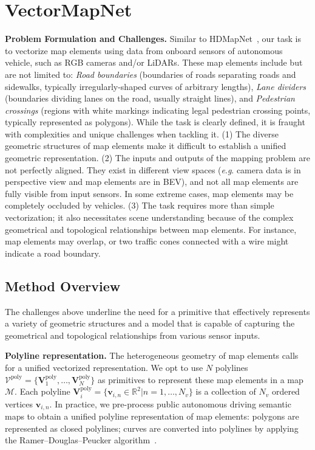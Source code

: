 \documentclass{article}
\newcommand{\eg}{\textit{e}.\textit{g}. }
\theoremstyle{plain}
\theoremstyle{definition}
\theoremstyle{remark}
\begin{document}
\section{VectorMapNet}
\label{sec:VectorMapNet}
\noindent\textbf{Problem Formulation and Challenges.}
Similar to HDMapNet~\citep{li2021hdmapnet}, our task is to vectorize map elements using data from onboard sensors of autonomous vehicle, such as RGB cameras and/or LiDARs. These map elements include but are not limited to: \textit{Road boundaries} (boundaries of roads separating roads and sidewalks, typically irregularly-shaped curves of arbitrary lengths), \textit{Lane dividers} (boundaries dividing lanes on the road, usually straight lines), and \textit{Pedestrian crossings} (regions with white markings indicating legal pedestrian crossing points, typically represented as polygons). 
While the task is clearly defined, it is fraught with complexities and unique challenges when tackling it.
(1) The diverse geometric structures of map elements make it difficult to establish a unified geometric representation. 
(2) The inputs and outputs of the mapping problem are not perfectly aligned. They exist in different view spaces (\eg camera data is in perspective view and map elements are in BEV), and not all map elements are fully visible from input sensors. In some extreme cases, map elements may be completely occluded by vehicles. 
(3) The task requires more than simple vectorization; it also necessitates scene understanding because of the complex geometrical and topological relationships between map elements. For instance, map elements may overlap, or two traffic cones connected with a wire might indicate a road boundary.

\subsection{Method Overview} 
\label{sec:model_overview}
The challenges above underline the need for a primitive that  effectively represents a variety of geometric structures and a model that is capable of capturing the geometrical and topological relationships from various sensor inputs.

\noindent\textbf{Polyline representation.}
The heterogeneous geometry of map elements calls for a unified vectorized representation. We opt to use $N$ polylines $\bm{\mathcal{V}}^{\mathrm{poly}}=\{\bm{V}_1^{\mathrm{poly}},\dots, \bm{V}_N^{\mathrm{poly}}\}$ as primitives to represent these map elements in a map $\mathcal{M}$. Each polyline $\bm{V}^{\mathrm{poly}}_i = \{\bm{v}_{i,n}\in\mathbb{R}^2| n=1,\dots,N_v\}$ is a collection of $N_v$ ordered vertices $\bm{v}_{i,n}$. In practice, we pre-process public autonomous driving semantic maps to obtain a unified polyline representation of map elements: polygons are represented as closed polylines; curves are converted into polylines by applying the Ramer–Douglas–Peucker algorithm~\citep{Ramer1972AnIP}.
\end{document}
